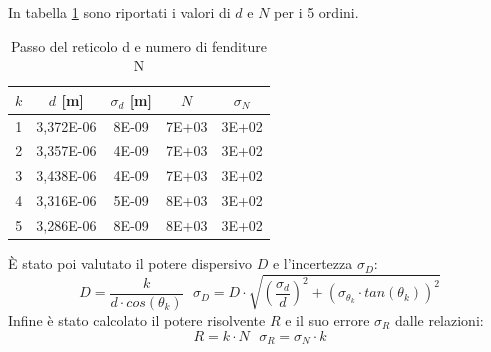 \documentclass{article}
\begin{document}
        In tabella \ref{tabular:passo reticolo e N} sono riportati i valori di $d$ e $N$ per i 5 ordini. 
        \begin{table}[H]

            \centering

            \begin{tabular}{c c c c c}

                \toprule 
                $k$ & $d$ [m] & $\sigma_d$ [m]  &  $N$  &   $\sigma_N$ \\
                
                \midrule
                1 & 3,372E-06	&	8E-09	&	7E+03   &   3E+02    \\
                2 & 3,357E-06	&	4E-09	&	7E+03   &   3E+02    \\
                3 & 3,438E-06	&	4E-09	&	7E+03   &   3E+02    \\
                4 & 3,316E-06	&	5E-09	&	8E+03   &   3E+02    \\
                5 & 3,286E-06	&	8E-09	&	8E+03   &   3E+02    \\
                \bottomrule
                
            \end{tabular}

            \caption{Passo del reticolo d e numero di fenditure N}
            \label{tabular:passo reticolo e N}

        \end{table}
  
        È stato poi valutato il potere dispersivo $D$ e l'incertezza $\sigma_D$: 
        \[D = \frac{k}{d \cdot cos(\theta_k)} \ \ \ \sigma_D = D \cdot \sqrt{(\frac{\sigma_d}{d})^2 + (\sigma_{\theta_k} \cdot tan(\theta_k))^2}\]
        Infine è stato calcolato il potere risolvente $R$ e il suo errore $\sigma_R$ dalle relazioni: \[R = k \cdot N \ \ \ \sigma_R = \sigma_N \cdot k\] \\ 
        
\end{document}
